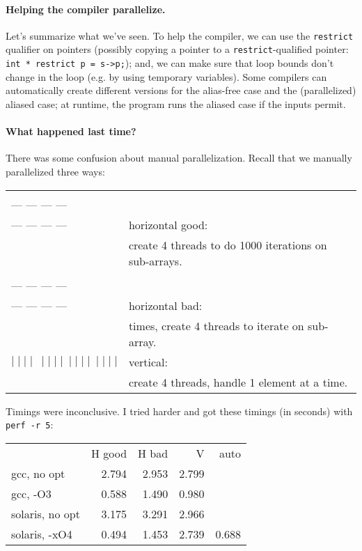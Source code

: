 \paragraph{Helping the compiler parallelize.} Let's summarize what we've
seen. To help the compiler, we can use the {\tt restrict} qualifier on
pointers (possibly copying a pointer to a {\tt restrict}-qualified
pointer: {\tt int * restrict p = s->p;}); and, we can make sure that
loop bounds don't change in the loop (e.g. by using temporary
variables). Some compilers can automatically create different versions
for the alias-free case and the (parallelized) aliased case; at
runtime, the program runs the aliased case if the inputs permit.

\paragraph{What happened last time?} There was some confusion about manual parallelization. Recall that we manually parallelized three ways:

\begin{tabular}{ll}
  \begin{minipage}{5em} --- --- --- ---\\[-.8em] --- --- --- ---\\[-.8em] --- --- --- --- \end{minipage}& horizontal good: \\
      & \qquad create 4 threads to do 1000 iterations on sub-arrays.\\
      \begin{minipage}{5em} --- --- --- ---\\[-.8em] --- --- --- ---\\[-.8em] --- --- --- --- \end{minipage}& horizontal bad: \\
      & \qquad 1000 times, create 4 threads to iterate on sub-array. \\
      $ \mid \mid \mid\mid \: \mid \mid \mid \mid \: \mid \mid \mid \mid\: \mid \mid \mid \mid$& vertical:\\
      & \qquad create 4 threads, handle 1 element at a time.\\[1em]
\end{tabular}

Timings were inconclusive. I tried harder and got these
timings (in seconds) with {\tt perf -r 5}:

      \begin{center}
      \begin{tabular}{lrrrr}
        & H good & H bad & V & auto \\
        gcc, no opt & 2.794 & 2.953 & 2.799\\
        gcc, -O3 & 0.588 & 1.490 & 0.980\\
        solaris, no opt & 3.175 & 3.291 & 2.966 \\
        solaris, -xO4 & 0.494 & 1.453 & 2.739 & 0.688\\
      \end{tabular}
      \end{center}

